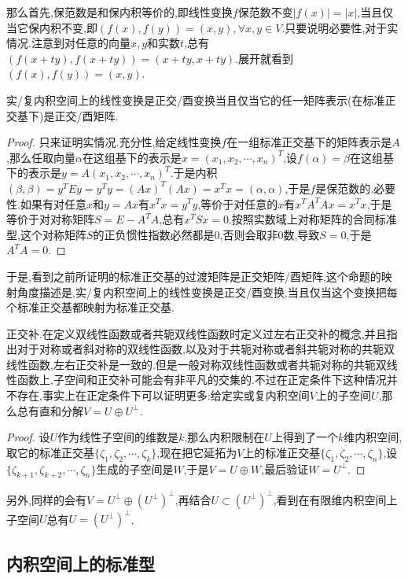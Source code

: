 那么首先,保范数是和保内积等价的,即线性变换$f$保范数不变$|f(x)|=|x|$,当且仅当它保内积不变,即$(f(x),f(y))=(x,y),\forall x,y\in V$.只要说明必要性,对于实情况.注意到对任意的向量$x,y$和实数$t$,总有$(f(x+ty),f(x+ty))=(x+ty,x+ty)$.展开就看到$(f(x),f(y))=(x,y)$.

实/复内积空间上的线性变换是正交/酉变换当且仅当它的任一矩阵表示(在标准正交基下)是正交/酉矩阵.
\begin{proof}
	
	只来证明实情况.充分性,给定线性变换$f$在一组标准正交基下的矩阵表示是$A$,那么任取向量$\alpha$在这组基下的表示是$x=(x_1,x_2,\cdots,x_n)^T$,设$f(\alpha)=\beta$在这组基下的表示是$y=A(x_1,x_2,\cdots,x_n)^T$.于是内积$(\beta,\beta)=y^TEy=y^Ty=(Ax)^T(Ax)=x^Tx=(\alpha,\alpha)$,于是$f$是保范数的.必要性.如果有对任意$x$和$y=Ax$有$x^Tx=y^Ty$,等价于对任意的$x$有$x^TA^TAx=x^Tx$,于是等价于对对称矩阵$S=E-A^TA$,总有$x^TSx=0$.按照实数域上对称矩阵的合同标准型,这个对称矩阵$S$的正负惯性指数必然都是0,否则会取非0数,导致$S=0$,于是$A^TA=0$.
	
\end{proof}

于是,看到之前所证明的标准正交基的过渡矩阵是正交矩阵/酉矩阵,这个命题的映射角度描述是,实/复内积空间上的线性变换是正交/酉变换,当且仅当这个变换把每个标准正交基都映射为标准正交基.

正交补.在定义双线性函数或者共轭双线性函数时定义过左右正交补的概念,并且指出对于对称或者斜对称的双线性函数,以及对于共轭对称或者斜共轭对称的共轭双线性函数,左右正交补是一致的.但是一般对称双线性函数或者共轭对称的共轭双线性函数上,子空间和正交补可能会有非平凡的交集的.不过在正定条件下这种情况并不存在,事实上在正定条件下可以证明更多:给定实或复内积空间$V$上的子空间$U$,那么总有直和分解$V=U\oplus U^{\perp}$.
\begin{proof}
	
	设$U$作为线性子空间的维数是$k$,那么内积限制在$U$上得到了一个$k$维内积空间,取它的标准正交基$\{\zeta_1,\zeta_2,\cdots,\zeta_k\}$,现在把它延拓为$V$上的标准正交基$\{\zeta_1,\zeta_2,\cdots,\zeta_n\}$,设$\{\zeta_{k+1},\zeta_{k+2},\cdots,\zeta_n\}$生成的子空间是$W$,于是$V=U\oplus W$,最后验证$W=U^{\perp}$.
	
\end{proof}

另外,同样的会有$V=U^{\perp}\oplus(U^{\perp})^{\perp}$,再结合$U\subset (U^{\perp})^{\perp}$,看到在有限维内积空间上子空间$U$总有$U=(U^{\perp})^{\perp}$.
\newpage
\subsection{内积空间上的标准型}

